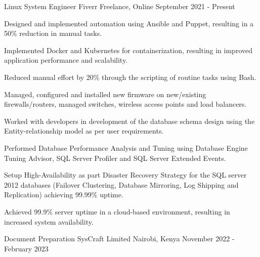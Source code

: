 \begin{cventries}
  \cventry
    {Linux System Engineer} %
    {Fiverr} %
    {Freelance, Online} %
    {September 2021 - Present} %
    {
      \begin{cvitems} %
        \item {Designed and implemented automation using Ansible and Puppet, resulting in a 50\% reduction in manual tasks.}
        \item {Implemented Docker and Kubernetes for containerization, resulting in improved application performance and scalability.}
        \item {Reduced manual effort by 20\% through the scripting of routine tasks using Bash.}
        \item {Managed, configured and installed new firmware on new/existing firewalls/routers, managed switches, wireless access points and load balancers.}
        \item {Worked with developers in development of the database schema design using the Entity-relationship model as per user requirements.}
        \item {Performed Database Performance Analysis and Tuning using Database Engine Tuning Advisor, SQL Server Profiler and SQL Server Extended Events.}
        \item {Setup High-Availability as part Disaster Recovery Strategy for the SQL server 2012 databases (Failover Clustering, Database Mirroring, Log Shipping and Replication) achieving 99.99\% uptime.}
        \item {Achieved 99.9\% server uptime in a cloud-based environment, resulting in increased system availability.}
      \end{cvitems}
    }
\cventry
    {Document Preparation} %
    {SysCraft Limited} %
    {Nairobi, Kenya} %
    {November 2022 - February 2023} %
    {
      \begin{cvitems} %

\end{cvitems}}
\end{cventries}
